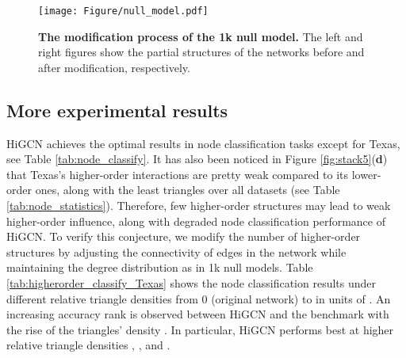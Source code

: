 \documentclass[letterpaper]{article} \usepackage{aaai24}
\theoremstyle{plain}
\theoremstyle{definition}
\theoremstyle{remark}
\begin{document}
\begin{figure}[h]
\centering
\texttt{[image: Figure/null\_model.pdf]}
\caption{\textbf{The modification process of the 1k null model.} The left and right figures show the partial structures of the networks before and after modification, respectively.}
\label{fig:1knull}
\end{figure}












\subsection{More experimental results}
\label{appendix: more_exp}

HiGCN achieves the optimal results in node classification tasks except for Texas, see Table \ref{tab:node_classify}.
It has also been noticed in Figure \ref{fig:stack5}(\textbf{d}) that Texas's higher-order interactions are pretty weak compared to its lower-order ones, along with the least triangles over all datasets (see Table \ref{tab:node_statistics}).
Therefore, few higher-order structures may lead to weak higher-order influence, along with degraded node classification performance of HiGCN. 
To verify this conjecture, we modify the number of higher-order structures by adjusting the connectivity of edges in the network while maintaining the degree distribution as in 1k null models.
Table \ref{tab:higherorder_classify_Texas} shows the node classification results under different relative triangle densities from 0 (original network) to  in units of .
An increasing accuracy rank is observed between HiGCN and the benchmark with the rise of the triangles' density .
In particular, HiGCN performs best at higher relative triangle densities , , and .
\end{document}
